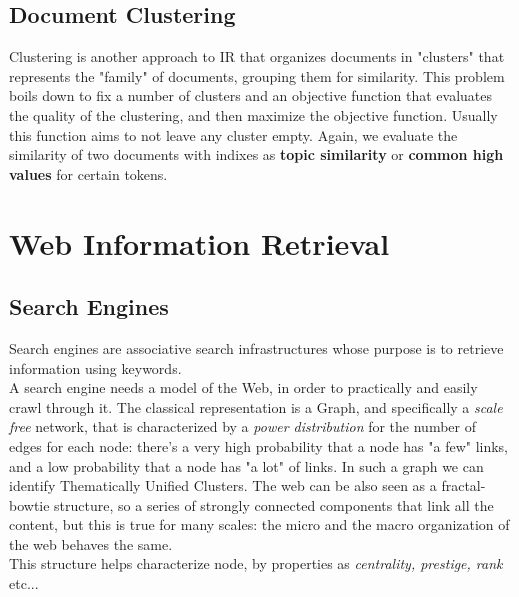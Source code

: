 \documentclass{article}
\begin{document}
		\subsection{Document Clustering}
			Clustering is another approach to IR that organizes documents in "clusters" that represents the "family" of documents, grouping them for similarity. This problem boils down to fix a number of clusters and an objective function that evaluates the quality of the clustering, and then maximize the objective function. Usually this function aims to not leave any cluster empty. Again, we evaluate the similarity of two documents with indixes as \textbf{topic similarity} or \textbf{common high values} for certain tokens.
					
	\section{Web Information Retrieval}
		\subsection{Search Engines}
			Search engines are associative search infrastructures whose purpose is to retrieve information using keywords.\\
			A search engine needs a model of the Web, in order to practically and easily crawl through it. The classical representation is a Graph, and specifically a \textit{scale free} network, that is characterized by a \textit{power distribution} for the number of edges for each node: there's a very high probability that a node has "a few" links, and a low probability that a node has "a lot" of links. In such a graph we can identify Thematically Unified Clusters. The web can be also seen as a fractal-bowtie structure, so a series of strongly connected components that link all the content, but this is true for many scales: the micro and the macro organization of the web behaves the same.\\
			This structure helps characterize node, by properties as \textit{centrality, prestige, rank} etc...
\end{document}
